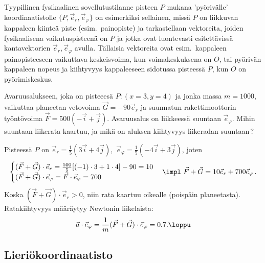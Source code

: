 Tyypillinen fysikaalinen sovellutustilanne pisteen $P$ mukana 'pyörivälle' koordinaatistolle 
$\{P,\vec e_r,\vec e_\varphi\}$ on esimerkiksi sellainen, missä $P$ on liikkuvan kappaleen 
kiinteä piste (esim.\ painopiste) ja tarkastellaan vektoreita, joiden fysikaalisena 
vaikutuspisteenä on $P$ ja jotka ovat luontevasti esitettävissä kantavektorien 
$\vec e_r,\vec e_\varphi$ avulla. Tällaisia vektoreita ovat esim.\ kappaleen painopisteeseen 
vaikuttava keskeisvoima, kun voimakeskuksena on $O$, tai pyörivän kappaleen nopeus ja kiihtyvyys
kappaleeseen sidotussa pisteessä $P$, kun $O$ on pyörimiskeskus.
\begin{Exa}
Avaruusalukseen, joka on pisteeesä $P:(x=3, y=4)$ ja jonka massa $m=1000$, vaikuttaa planeetan 
vetovoima $\vec G=-90\vec e_r$ ja suunnatun rakettimoottorin työntövoima 
$\vec F=500(-\vec i + \vec j)$. Avaruusalus on liikkeessä suuntaan $\vec e_\varphi$. Mihin 
suuntaan liikerata kaartuu, ja mikä on aluksen kiihtyvyys liikeradan suuntaan\,?
\end{Exa}
\ratk Pisteessä $P$ on $\vec e_r = \frac{1}{5}(3\vec i + 4\vec j)$, 
$\,\vec e_\varphi = \frac{1}{5}(-4\vec i + 3\vec j)$, joten
\[ \begin{cases}
(\vec F + \vec G) \cdot \vec e_r = \frac{500}{5}[(-1) \cdot 3 + 1 \cdot 4] - 90 =10 \\
(\vec F + \vec G) \cdot \vec e_\varphi = \vec F \cdot \vec e_\varphi = 700
\end{cases} 
\impl\ \vec F + \vec G = 10 \vec e_r + 700 \vec e_\varphi\,.
\]
Koska $(\vec F + \vec G) \cdot \vec e_r >0$, niin rata kaartuu oikealle (poispäin planeetasta).
Ratakiihtyvyys määräytyy Newtonin liikelaista:
\[
\vec a \cdot \vec e_\varphi = \frac{1}{m}(\vec F + \vec G) \cdot \vec e_\varphi = 0.7. \loppu 
\]

\subsection*{Lieriökoordinaatisto}

